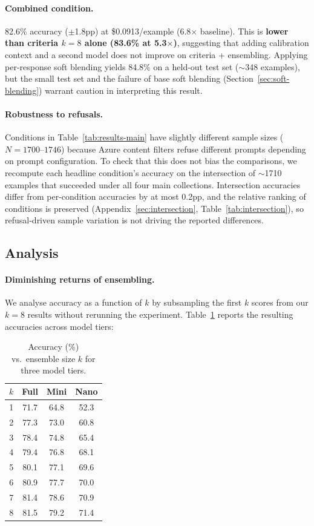 \documentclass{article}
\begin{document}
\paragraph{Combined condition.} 82.6\% accuracy ($\pm$1.8pp) at \$0.0913/example (6.8$\times$ baseline). This is \textbf{lower than criteria $k{=}8$ alone (83.6\% at 5.3$\times$)}, suggesting that adding calibration context and a second model does not improve on criteria + ensembling. Applying per-response soft blending yields 84.8\% on a held-out test set (${\sim}$348 examples), but the small test set and the failure of base soft blending (Section~\ref{sec:soft-blending}) warrant caution in interpreting this result.

\paragraph{Robustness to refusals.} Conditions in Table~\ref{tab:results-main} have slightly different sample sizes ($N{=}1700$--$1746$) because Azure content filters refuse different prompts depending on prompt configuration. To check that this does not bias the comparisons, we recompute each headline condition's accuracy on the intersection of ${\sim}$1710 examples that succeeded under all four main collections. Intersection accuracies differ from per-condition accuracies by at most 0.2pp, and the relative ranking of conditions is preserved (Appendix~\ref{sec:intersection}, Table~\ref{tab:intersection}), so refusal-driven sample variation is not driving the reported differences.

\subsection{Analysis}
\label{sec:ablations}

\paragraph{Diminishing returns of ensembling.} We analyse accuracy as a function of $k$ by subsampling the first $k$ scores from our $k{=}8$ results without rerunning the experiment. Table~\ref{tab:diminishing-returns} reports the resulting accuracies across model tiers:

\begin{table}[ht]
\centering
\caption{Accuracy (\%) vs.\ ensemble size $k$ for three model tiers.}
\label{tab:diminishing-returns}
\begin{tabular}{cccc}
\toprule
$k$ & Full & Mini & Nano \\
\midrule
1 & 71.7 & 64.8 & 52.3 \\
2 & 77.3 & 73.0 & 60.8 \\
3 & 78.4 & 74.8 & 65.4 \\
4 & 79.4 & 76.8 & 68.1 \\
5 & 80.1 & 77.1 & 69.6 \\
6 & 80.9 & 77.7 & 70.0 \\
7 & 81.4 & 78.6 & 70.9 \\
8 & 81.5 & 79.2 & 71.4 \\
\bottomrule
\end{tabular}
\end{table}
\end{document}
